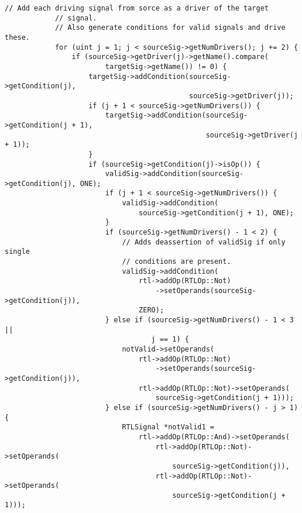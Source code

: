 \lstset{language=C++,style=Cstyle}
\begin{lstlisting}[capton={Source Code: Generating valid signals},label=sec:validsinglssourcecode]
// Add each driving signal from sorce as a driver of the target
            // signal.
            // Also generate conditions for valid signals and drive these.
            for (uint j = 1; j < sourceSig->getNumDrivers(); j += 2) {
                if (sourceSig->getDriver(j)->getName().compare(
                        targetSig->getName()) != 0) {
                    targetSig->addCondition(sourceSig->getCondition(j),
                                            sourceSig->getDriver(j));
                    if (j + 1 < sourceSig->getNumDrivers()) {
                        targetSig->addCondition(sourceSig->getCondition(j + 1),
                                                sourceSig->getDriver(j + 1));
                    }
                    if (sourceSig->getCondition(j)->isOp()) {
                        validSig->addCondition(sourceSig->getCondition(j), ONE);
                        if (j + 1 < sourceSig->getNumDrivers()) {
                            validSig->addCondition(
                                sourceSig->getCondition(j + 1), ONE);
                        }
                        if (sourceSig->getNumDrivers() - 1 < 2) {
                            // Adds deassertion of validSig if only single
                            // conditions are present.
                            validSig->addCondition(
                                rtl->addOp(RTLOp::Not)
                                    ->setOperands(sourceSig->getCondition(j)),
                                ZERO);
                        } else if (sourceSig->getNumDrivers() - 1 < 3 ||
                                   j == 1) {
                            notValid->setOperands(
                                rtl->addOp(RTLOp::Not)
                                    ->setOperands(sourceSig->getCondition(j)),
                                rtl->addOp(RTLOp::Not)->setOperands(
                                    sourceSig->getCondition(j + 1)));
                        } else if (sourceSig->getNumDrivers() - j > 1) {
                            RTLSignal *notValid1 =
                                rtl->addOp(RTLOp::And)->setOperands(
                                    rtl->addOp(RTLOp::Not)->setOperands(
                                        sourceSig->getCondition(j)),
                                    rtl->addOp(RTLOp::Not)->setOperands(
                                        sourceSig->getCondition(j + 1)));

\end{lstlisting}
